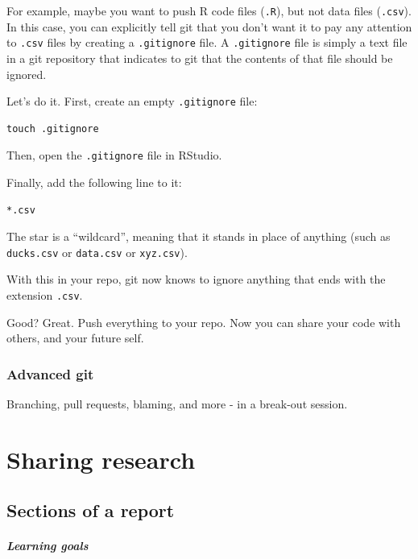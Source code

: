 \documentclass[
]{book}
\begin{document}
For example, maybe you want to push R code files (\texttt{.R}), but not data files (\texttt{.csv}). In this case, you can explicitly tell git that you don't want it to pay any attention to \texttt{.csv} files by creating a \texttt{.gitignore} file. A \texttt{.gitignore} file is simply a text file in a git repository that indicates to git that the contents of that file should be ignored.

Let's do it. First, create an empty \texttt{.gitignore} file:

\begin{verbatim}
touch .gitignore
\end{verbatim}

Then, open the \texttt{.gitignore} file in RStudio.

Finally, add the following line to it:

\begin{verbatim}
*.csv
\end{verbatim}

The star is a ``wildcard'', meaning that it stands in place of anything (such as \texttt{ducks.csv} or \texttt{data.csv} or \texttt{xyz.csv}).

With this in your repo, git now knows to ignore anything that ends with the extension \texttt{.csv}.

Good? Great. Push everything to your repo. Now you can share your code with others, and your future self.

\hypertarget{advanced-git}{%
\section*{Advanced git}\label{advanced-git}}

Branching, pull requests, blaming, and more - in a break-out session.

\hypertarget{part-sharing-research}{%
\part{Sharing research}\label{part-sharing-research}}

\hypertarget{sections-of-a-report}{%
\chapter{Sections of a report}\label{sections-of-a-report}}

\hypertarget{learning-goals-22}{%
\subsubsection*{Learning goals}\label{learning-goals-22}}
\end{document}
